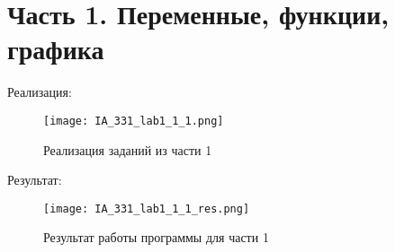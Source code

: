 \chapter{Часть 1. Переменные, функции, графика}
\label{ch:intro}

Реализация:\\

\begin{figure}[ht]
    \centering
    \texttt{[image: IA\_331\_lab1\_1\_1.png]}
    \caption{Реализация заданий из части 1}
    \label{fig:open_audio}
\end{figure}

Результат:\\

\begin{figure}[ht]
    \centering
    \texttt{[image: IA\_331\_lab1\_1\_1\_res.png]}
    \caption{Результат работы программы для части 1}
    \label{fig:open_audio}
\end{figure}

\endinput